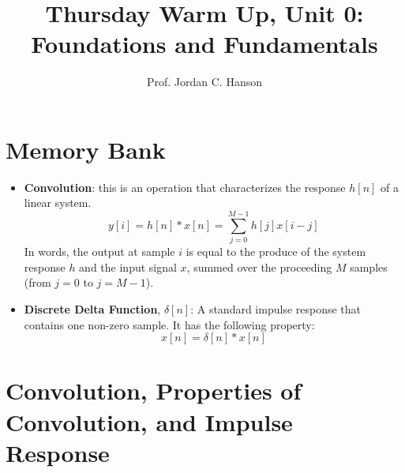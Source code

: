 \documentclass{article}
\begin{document}
\twocolumn

\title{Thursday Warm Up, Unit 0: Foundations and Fundamentals}
\author{Prof. Jordan C. Hanson}
\maketitle

\section{Memory Bank}
\small
\begin{itemize}
\item \textbf{Convolution}: this is an operation that characterizes the response $h[n]$ of a linear system.
\begin{equation}
y[i] = h[n] * x[n] = \sum_{j=0}^{M-1}h[j]x[i-j] \label{eq:conv}
\end{equation}
In words, the output at sample $i$ is equal to the produce of the system response $h$ and the input signal $x$, summed over the proceeding $M$ samples (from $j=0$ to $j=M-1$).
\item \textbf{Discrete Delta Function}, $\delta[n]$: A standard impulse response that contains one non-zero sample.  It has the following property:
\begin{equation}
x[n] = \delta[n] * x[n] \label{eq:conv2}
\end{equation}
\end{itemize}

\section{Convolution, Properties of Convolution, and Impulse Response}
\end{document}
